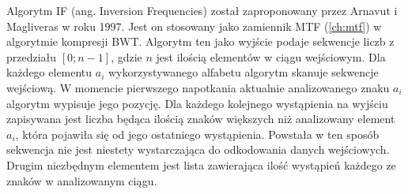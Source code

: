 
Algorytm IF (ang. Inversion Frequencies)\cite{deorowicz} został zaproponowany przez Arnavut i Magliveras w roku 1997. Jest on stosowany jako zamiennik MTF (\ref{ch:mtf}) w algorytmie kompresji BWT. Algorytm ten jako wyjście podaje sekwencje liczb z przedziału $[0; n -1]$, gdzie $n$ jest ilością elementów w ciągu wejściowym. Dla każdego elementu $a_i$ wykorzystywanego alfabetu algorytm skanuje sekwencje wejściową. W momencie pierwszego napotkania aktualnie analizowanego znaku $a_i$ algorytm wypisuje jego pozycję. Dla każdego kolejnego wystąpienia na wyjściu zapisywana jest liczba będąca ilością znaków większych niż analizowany element  $a_i$, która pojawiła się od jego ostatniego wystąpienia. Powstała w ten sposób sekwencja nie jest niestety wystarczająca do odkodowania danych wejściowych. Drugim niezbędnym elementem jest lista zawierająca ilość wystąpień każdego ze znaków w analizowanym ciągu.